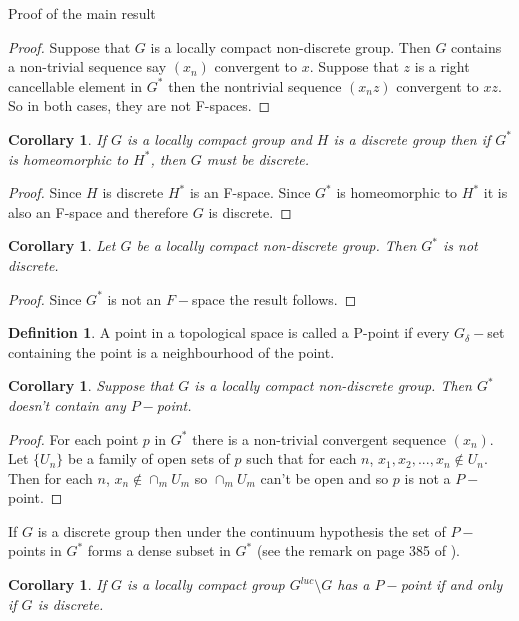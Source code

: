 \documentclass[12pt,a4paper]{amsart}
\theoremstyle{plain}
\newtheorem{corollary}[theorem]{Corollary}
\theoremstyle{definition}
\newtheorem{definition}[theorem]{Definition}
\begin{document}
\begin{section}{Proof of the main result}
\begin{proof}
Suppose that $G$ is a locally compact non-discrete group. Then $G$ contains a non-trivial sequence say $(x_n)$ convergent to $x$. Suppose that $z$ is a right cancellable element in $G^*$ then the nontrivial sequence $(x_nz)$ convergent to $xz$. So in both cases, they are not F-spaces.
\end{proof}

\begin{corollary}

If $G$ is a locally compact group and $H$ is a discrete group then if $G^*$ is homeomorphic to $H^*$, then $G$ must be discrete. 
\end{corollary}
\begin{proof}
Since $H$ is discrete $H^*$ is an F-space. Since $G^*$ is homeomorphic to $H^*$ it is also an F-space and therefore $G$ is discrete.
\end{proof}

\begin{corollary}
Let $G$ be a locally compact non-discrete group. Then $G^*$ is not discrete.
\end{corollary}
\begin{proof}
Since $G^*$ is not an $F-$space  the result follows.
\end{proof}

\begin{definition}
A point in a topological space is called a P-point if every $G_{\delta}-$set containing the point is a neighbourhood of the point.
\end{definition}

\begin{corollary}
Suppose that $G$ is a locally compact non-discrete group. Then $G^*$ doesn't contain any $P-$point.
\end{corollary}
\begin{proof}
For each point $p$ in $G^*$ there is a non-trivial convergent sequence $(x_n)$. Let $\{U_n\}$ be a family of open sets of $p$ such that for each $n$, $x_1,x_2,...,x_n\not\in U_n$. Then for each $n$, $x_n\not\in\cap_m U_m$ so $\cap_m U_m$ can't be open and so $p$ is not a $P-$point.
\end{proof}
If $G$ is a discrete group then under the continuum hypothesis the set of $P-$points in $G^*$ forms a dense subset in $G^*$ (see the remark on page 385 of \cite{MR1377702}).
\begin{corollary}
If $G$ is a locally compact group $G^{luc}\setminus G$ has a $P-$point if and only if $G$ is discrete.
\end{corollary}

\end{section}



\nocite{*}



\end{document}
